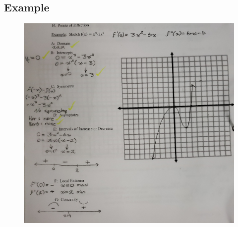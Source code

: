 \documentclass[a4paper,12pt]{article}
\begin{document}
\subsection{Example}
\begin{figure}[H]
    \centering
    \includegraphics[width=\textwidth]{eg}
\end{figure}
\end{document}
